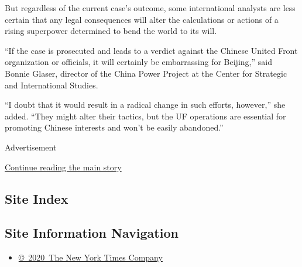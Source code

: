 But regardless of the current case's outcome, some international
analysts are less certain that any legal consequences will alter the
calculations or actions of a rising superpower determined to bend the
world to its will.

``If the case is prosecuted and leads to a verdict against the Chinese
United Front organization or officials, it will certainly be
embarrassing for Beijing,'' said Bonnie Glaser, director of the China
Power Project at the Center for Strategic and International Studies.

``I doubt that it would result in a radical change in such efforts,
however,'' she added. ``They might alter their tactics, but the UF
operations are essential for promoting Chinese interests and won't be
easily abandoned.''

Advertisement

\protect\hyperlink{after-bottom}{Continue reading the main story}

\hypertarget{site-index}{%
\subsection{Site Index}\label{site-index}}

\hypertarget{site-information-navigation}{%
\subsection{Site Information
Navigation}\label{site-information-navigation}}

\begin{itemize}
\tightlist
\item
  \href{https://help.nytimes.com/hc/en-us/articles/115014792127-Copyright-notice}{©~2020~The
  New York Times Company}
\end{itemize}

